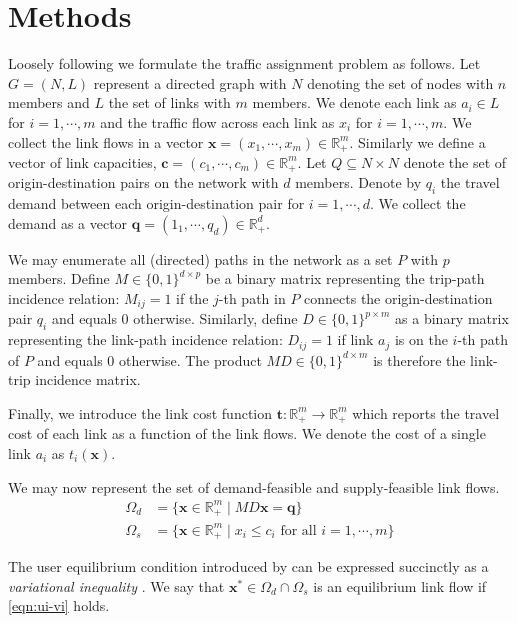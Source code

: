 \section{Methods}

Loosely following \citet{smith1979existence} we formulate the traffic assignment problem as follows. Let $G=(N,L)$ represent a directed graph with $N$ denoting the set of nodes with $n$ members and $L$ the set of links with $m$ members. We denote each link as $a_i\in L$ for $i=1,\cdots,m$ and the traffic flow across each link as $x_i$ for $i=1,\cdots,m$. We collect the link flows in a vector $\mathbf{x}=(x_1,\cdots, x_m)\in\mathbb{R}_+^m$. Similarly we define a vector of link capacities, $\mathbf{c}=(c_1, \cdots, c_m)\in \mathbb{R}_+^m$. Let $Q\subseteq N\times N$ denote the set of origin-destination pairs on the network with $d$ members. Denote by $q_i$ the travel demand between each origin-destination pair for $i=1,\cdots,d$. We collect the demand as a vector $\mathbf{q}=(1_1, \cdots, q_d)\in\mathbb{R}_+^d$. 

We may enumerate all (directed) paths in the network as a set $P$ with $p$ members. Define $M \in \{0, 1\}^{d\times p}$ be a binary matrix representing the trip-path incidence relation: $M_{ij} = 1$ if the $j$-th path in $P$ connects the origin-destination pair $q_i$ and equals $0$ otherwise. Similarly, define $D\in \{0, 1\}^{p\times m}$ as a binary matrix representing the link-path incidence relation: $D_{ij}=1$ if link $a_j$ is on the $i$-th path of $P$ and equals $0$ otherwise. The product $MD \in \{0, 1\}^{d \times m}$ is therefore the link-trip incidence matrix.

Finally, we introduce the link cost function $\mathbf{t}: \mathbb{R}_+^m \to \mathbb{R}_+^m$ which reports the travel cost of each link as a function of the link flows. We denote the cost of a single link $a_i$ as $t_i(\mathbf{x})$.

We may now represent the set of demand-feasible and supply-feasible link flows.
\begin{align}
    \Omega_d &= \{\mathbf{x} \in \mathbb{R}_+^m \mid MD\mathbf{x}= \mathbf{q}\}\label{eqn:demand-feasible-link-flow}\\
    \Omega_s &= \{\mathbf{x} \in \mathbb{R}_+^m \mid x_i \leq c_i \text{ for all } i=1,\cdots, m \} \label{eqn:supply-feasible-link-flow}
\end{align}

The user equilibrium condition introduced by \citet{wardrop1952some} can be expressed succinctly as a \textit{variational inequality} \citep{smith1979existence,dafermos1980traffic,nagurney2009netecon}. We say that $\mathbf{x^*}\in\Omega_d\cap \Omega_s$ is an equilibrium link flow if \eqref{eqn:ui-vi} holds.

